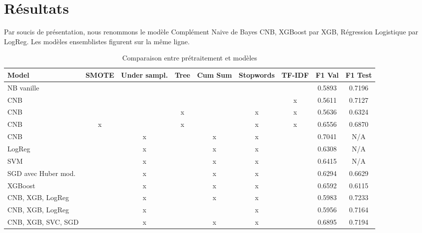 \documentclass{article}
\begin{document}
\section{Résultats}
Par soucis de présentation, nous renommons le modèle Complément Naive de Bayes CNB, XGBoost par XGB, Régression Logistique par LogReg. Les modèles ensemblistes figurent sur la même ligne.
\begin{table}[H]
    \centering
    \begin{tabular}{|l|c|c|c|c|c|c|c|c|}
        \hline
        \textbf{Model} & \textbf{SMOTE} & \textbf{Under sampl.} & \textbf{Tree} &
        \textbf{Cum Sum} & \textbf{Stopwords} & \textbf{TF-IDF} &
        \textbf{F1 Val} & 
        \textbf{F1 Test} \\
        \hline
        NB vanille &  &  &  &  &  &  & 0.5893 & 0.7196\\
        CNB &  &  &  &  &  & x & 0.5611 & 0.7127\\
        CNB &  &  & x &  & x & x & 0.5636 & 0.6324\\
        CNB & x &  & x &  & x & x & 0.6556 & 0.6870\\
        CNB &  & x &  & x & x &  & 0.7041 & N/A\\
        LogReg &  & x &  & x & x &  & 0.6308 & N/A\\
        SVM &  & x &  & x & x &  & 0.6415 & N/A\\
        SGD avec Huber mod. &  & x &  & x & x &  & 0.6294 & 0.6629\\
        XGBoost &  & x &  & x & x &  & 0.6592 & 0.6115\\
        CNB, XGB, LogReg &  & x &  & x & x &  & 0.5983 & 0.7233\\
        CNB, XGB, LogReg &  & x &  &  & x &  & 0.5956 & 0.7164\\
        CNB, XGB, SVC, SGD &  & x &  & x & x &  & 0.6895 & 0.7194\\
        \hline
    \end{tabular}
    \caption{Comparaison entre prétraitement et modèles}
    \label{tab:model_comparison}
\end{table}
\end{document}

